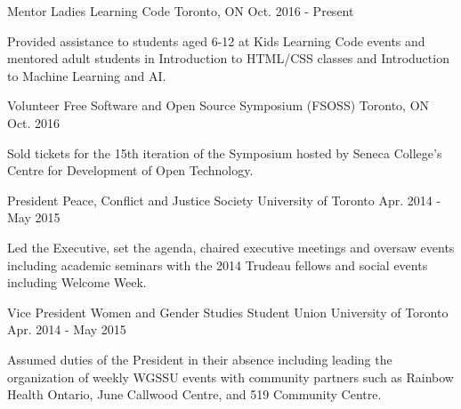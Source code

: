 

\begin{cventries}

  \cventry
    {Mentor} %
    {Ladies Learning Code} %
    {Toronto, ON} %
    {Oct. 2016 - Present} %
    {
      \begin{cvitems} %
        \item {Provided assistance to students aged 6-12 at Kids Learning Code events and mentored adult students in Introduction to HTML/CSS classes and Introduction to Machine Learning and AI.}
      \end{cvitems}
    }

  \cventry
    {Volunteer} %
    {Free Software and Open Source Symposium (FSOSS)} %
    {Toronto, ON} %
    {Oct. 2016} %
    {
      \begin{cvitems} %
        \item {Sold tickets for the 15th iteration of the Symposium hosted by Seneca College’s Centre for Development of Open Technology.}
      \end{cvitems}
    }

  \cventry
    {President} %
    {Peace, Conflict and Justice Society} %
    {University of Toronto} %
    {Apr. 2014 - May 2015} %
    {
      \begin{cvitems} %
        \item {Led the Executive, set the agenda, chaired executive meetings and oversaw events including academic seminars with the 2014 Trudeau fellows and social events including Welcome Week.}
      \end{cvitems}
    }

  \cventry
    {Vice President} %
    {Women and Gender Studies Student Union } %
    {University of Toronto} %
    {Apr. 2014 - May 2015} %
    {
      \begin{cvitems} %
        \item {Assumed duties of the President in their absence including leading the organization of weekly WGSSU events with community partners such as Rainbow Health Ontario, June Callwood Centre, and 519 Community Centre.}
      \end{cvitems}
    }


\end{cventries}
